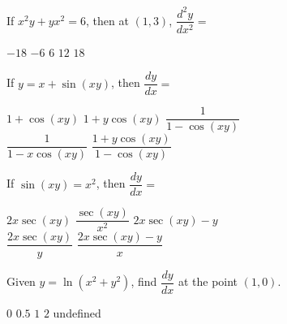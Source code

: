 \begin{questions}
    \question If $x^2y + yx^2 = 6$, then at $(1, 3)$, $\dfrac{d^2y}{dx^2} = $ \\

    \begin{oneparchoices}
        \choice $-18$
        \choice $-6$
        \choice $6$
        \choice $12$
        \choice $18$
    \end{oneparchoices} \par \horizontalline

    \question If $y = x + \sin (xy)$, then $\dfrac{dy}{dx} = $ \\
    
    \begin{oneparchoices}
        \choice $1 + \cos (xy)$
        \choice $1 + y\cos (xy)$
        \choice $\dfrac{1}{1 - \cos (xy)}$ \\[11pt]
        \makebox[0.22\textwidth] \choice $\dfrac{1}{1 - x\cos (xy)}$
        \makebox[0.24\textwidth] \choice $\dfrac{1 + y\cos (xy)}{1 - \cos (xy)}$
    \end{oneparchoices} \par \horizontalline

    \question If $\sin (xy) = x^2$, then $\dfrac{dy}{dx} = $ \\

    \begin{oneparchoices}
        \choice $2x\sec (xy)$
        \choice $\dfrac{\sec (xy)}{x^2}$
        \choice $2x\sec (xy) - y$ \\[11pt]
        \makebox[0.22\textwidth] \choice $\dfrac{2x\sec (xy)}{y}$
        \makebox[0.25\textwidth] \choice $\dfrac{2x\sec (xy) - y}{x}$
    \end{oneparchoices} \par \horizontalline

    \question Given $y = \ln \left(x^2 + y^2\right)$, find $\dfrac{dy}{dx}$ at the point $(1, 0)$. \\

    \begin{oneparchoices}
        \choice $0$
        \choice $0.5$
        \choice $1$
        \choice $2$
        \choice undefined
    \end{oneparchoices} \par \horizontalline
\end{questions} 

